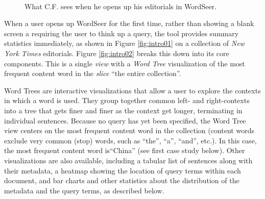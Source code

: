 \documentclass{sig-alternate}
\begin{document}
\begin{figure}[ht!]
\begin{center}
%
        \\
%
    \end{center}
    \caption{%
        What C.F. sees when he opens up his editorials in WordSeer.
     }%
\end{figure}

When a user opens up WordSeer for the first time, rather than showing a blank screen a requiring the user to think up a query, the tool  provides summary statistics immediately, as shown in Figure \ref{fig:intro01} on a collection of \emph{New York Times} editorials.  Figure \ref{fig:intro02} breaks this down into its core components. This is a single \emph{view} with a \emph{Word Tree} visualization of the most frequent content word in the \emph{slice} ``the entire collection''. 

Word Trees \cite{wattenberg_word_2008} are interactive visualizations that allow a user to explore the contexts in which a word is used. They group together common left- and right-contexts into a tree that gets finer and finer as the context get longer, terminating in individual sentences.  Because no query has yet been specified, the Word Tree view centers on the most frequent content word in the collection (content words exclude very common (stop) words, such as ``the'', ``a'', ``and'', etc.). In this case, the most frequent content word is``China'' (see first case study below).  Other visualizations are also available, including a tabular list of sentences along with their metadata, a heatmap showing the location of query terms within each document, and bar charts and other statistics about the distribution of the metadata and the query terms, as described below.
\end{document}
